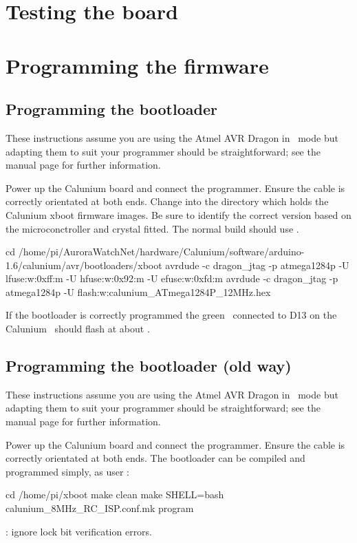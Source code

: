 \section{Testing the board}

\section{Programming the firmware}

\subsection{Programming the bootloader}

These instructions assume you are using the Atmel AVR Dragon in \jtag\
mode but adapting them to suit your programmer should be
straightforward; see the  manual page for further
information.

Power up the Calunium board and connect the programmer. Ensure the
cable is correctly orientated at both ends. Change into the directory
which holds the Calunium xboot firmware images. Be sure to identify
the correct version based on the microconctroller and crystal
fitted. The normal build should use
.

\begin{Cmd}
  cd /home/pi/AuroraWatchNet/hardware/Calunium/software/arduino-1.6/calunium/avr/bootloaders/xboot
  avrdude -c dragon_jtag -p atmega1284p -U lfuse:w:0xff:m -U hfuse:w:0x92:m -U efuse:w:0xfd:m
  avrdude -c dragon_jtag -p atmega1284p -U flash:w:calunium_ATmega1284P_12MHz.hex
\end{Cmd}

If the bootloader is correctly programmed the green \led\ connected to
D13 on the Calunium \pcb\ should flash at about \Hz{1}.

\subsection{Programming the bootloader (old way)}

These instructions assume you are using the Atmel AVR Dragon in \isp\
mode but adapting them to suit your programmer should be
straightforward; see the \filename{avrdude} manual page for further
information.

Power up the Calunium board and connect the programmer. Ensure the
cable is correctly orientated at both ends. The bootloader can be
compiled and programmed simply, as user \piUser: \todo[Check directory]
\begin{Cmd}
  cd /home/pi/xboot
  make clean
  make SHELL=bash calunium_8MHz_RC_ISP.conf.mk program
\end{Cmd}
\todo: ignore lock bit verification errors.

